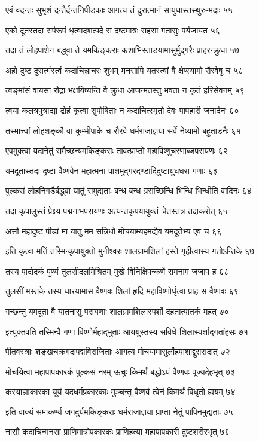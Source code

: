 एवं वदन्तः सुभृशं दन्तैर्दन्तनिपीडकाः
आगत्य तं दुरात्मानं सायुधास्तस्थुरुन्मदाः ५५

एको दूतस्तदा सर्परूपं धृत्वादशत्पदे
स दष्टमात्रः सहसा गतासुः पर्यजायत ५६

तदा तं लोहपाशेन बद्ध्वा ते यमकिङ्कराः
कशाभिस्ताडयामासुर्मुद्गरैः प्राहरन्क्रुधा ५७

अहो दुष्ट दुरात्मंस्त्वं कदाचिन्नाचरः शुभम्
मनसापि यतस्त्वां वै क्षेप्स्यामो रौरवेषु च ५८

त्वङ्मांसं वायसा रौद्रा भक्षयिष्यन्ति वै क्रुधा
आजन्मतस्तु भवता न कृतं हरिसेवनम् ५९

त्वया कलत्रपुत्राद्या द्रोहं कृत्वा सुपोषिताः
न कदाचित्स्मृतो देवः पापहारी जनार्दनः ६०

तस्मात्त्वां लोहशङ्कौ वा कुम्भीपाके च रौरवे
धर्मराजाज्ञया सर्वे नेष्यामो बहुताडनैः ६१

एवमुक्त्वा यदानेतुं समैच्छन्यमकिङ्कराः
तावत्प्राप्तो महाविष्णुचरणाब्जपरायणः ६२

यमदूतास्तदा दृष्टा वैष्णवेन महात्मना
पाशमुद्गरदण्डादिदुष्टायुधधरा गणाः ६३

पुल्कसं लोहनिगडैर्बद्ध्वा यातुं समुद्यताः
बन्ध बन्ध ग्रसच्छिन्धि भिन्धि भिन्धीति वादिनः ६४

तदा कृपालुस्तं प्रेक्ष्य पद्मनाभपरायणः
अत्यन्तकृपयायुक्तं चेतस्तत्र तदाकरोत् ६५

असौ महादुष्ट पीडां मा यातु मम सन्निधौ
मोचयाम्यहमद्यैव यमदूतेभ्य एव च ६६

इति कृत्वा मतिं तस्मिन्कृपायुक्तो मुनीश्वरः
शालग्रामशिलां हस्ते गृहीत्वास्य गतोऽन्तिके ६७

तस्य पादोदकं पुण्यं तुलसीदलमिश्रितम्
मुखे विनिक्षिपन्कर्णे रामनाम जजाप ह ६८

तुलसीं मस्तके तस्य धारयामास वैष्णवः
शिलां हृदि महाविष्णोर्धृत्वा प्राह स वैष्णवः ६९

गच्छन्तु यमदूता वै यातनासु परायणाः
शालग्रामशिलास्पर्शो दहतात्पातकं महत् ७०

इत्युक्तवति तस्मिन्वै गणा विष्णोर्महाद्भुताः
आययुस्तस्य सविधे शिलास्पर्शाद्गतांहसः ७१

पीतवस्त्राः शङ्खचक्रगदापद्मविराजिताः
आगत्य मोचयामासुर्लोहपाशाद्दुरासदात् ७२

मोचयित्वा महापापकारकं पुल्कसं नरम्
ऊचुः किमर्थं बद्धोऽयं वैष्णवः पूज्यदेहभृत् ७३

कस्याज्ञाकारका यूयं यदधर्मप्रकारकाः
मुञ्चन्तु वैष्णवं त्वेनं किमर्थं विधृतो ह्ययम् ७४

इति वाक्यं समाकर्ण्य जगदुर्यमकिङ्कराः
धर्मराजाज्ञया प्राप्ता नेतुं पापिनमुद्यताः ७५

नासौ कदाचिन्मनसा प्राणिमात्रोपकारकः
प्राणिहत्या महापापकारी दुष्टशरीरभृत् ७६

